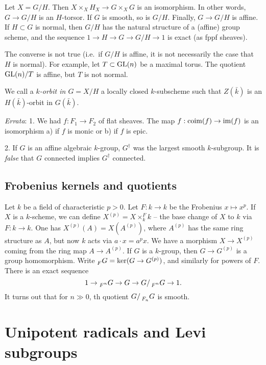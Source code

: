 \documentclass{article}
\begin{document}
Let $X=G/H$. Then $X\times_X H_X\to G\times_X G$ is an isomorphism. In other 
words, $G\to G/H$ is an $H$-torsor. If $G$ is smooth, so is $G/H$. Finally, 
$G\to G/H$ is affine. If $H\subset G$ is normal, then $G/H$ has the natural 
structure of a (affine) group scheme, and the sequence 
$1\to H \to G \to G/H \to 1$ is exact (as fppf sheaves). 

The converse is not true (i.e.\ if $G/H$ is affine, it is not necessarily the 
case that $H$ is normal). For example, let $T\subset \operatorname{GL}(n)$ be a 
maximal torus. The quotient $\operatorname{GL}(n)/T$ is affine, but $T$ is not 
normal. 

We call a \emph{$k$-orbit in $G=X/H$} a locally closed $k$-subscheme such that 
$Z(\bar k)$ is an $H(\bar k)$-orbit in $G(\bar k)$. 

\emph{Errata}: 1. We had $f:F_1\to F_2$ of flat sheaves. The map 
$f:\operatorname{coim}(f) \to \operatorname{im}(f)$ is an isomorphism a) if $f$ is monic or b) if 
$f$ is epic. 

2. If $G$ is an affine algebraic $k$-group, $G^\dagger$ was the largest smooth 
$k$-subgroup. It is \emph{false} that $G$ connected implies $G^\dagger$ connected. 


\subsection{Frobenius kernels and quotients}

Let $k$ be a field of characteristic $p>0$. Let $F:k\to k$ be the Frobenius 
$x\mapsto x^p$. If $X$ is a $k$-scheme, we can define 
$X^{(p)}=X\times_k^F k$ -- the base change of $X$ to $k$ via $F:k\to k$. 
One has $X^{(p)}(A) = X(A^{(p)})$,  where 
$A^{(p)}$ has the same ring structure as $A$, but now $k$ acts via 
$a\cdot x = a^p x$. We have a morphism $X\to X^{(p)}$ coming from the 
ring map $A\to A^{(p)}$. If $G$ is a $k$-group, then $G\to G^{(p)}$ is a 
group homomorphism. Write $\prescript{}{F}{G}=\ker(G\to G^{(p)})$, and 
similarly for powers of $F$. There is an exact sequence 
\[
  1 \to \prescript{}{F^n}{G} \to G \to G/\prescript{}{F^n}{G} \to 1 .
\]
It turns out that for $n\gg 0$, th quotient $G/\prescript{}{F_n}{G}$ is 
smooth. 





\section{Unipotent radicals and Levi subgroups}
\end{document}
